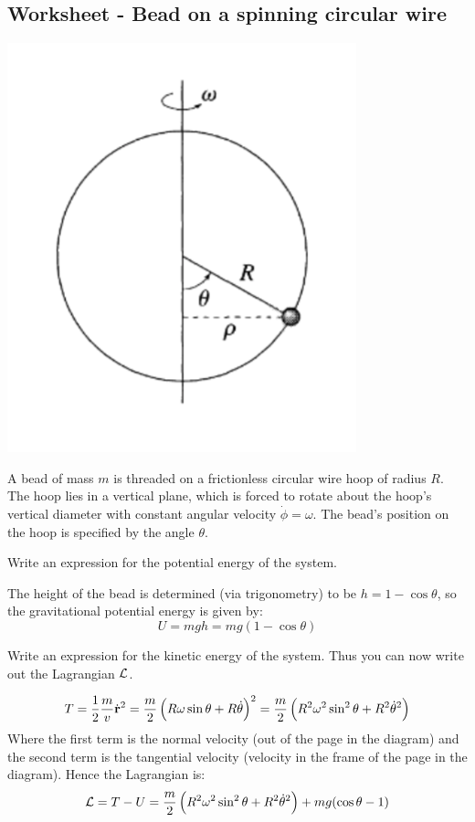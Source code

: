\documentclass[../PHYS306Notes.tex]{subfiles}
\begin{document}
\subsection{Worksheet - Bead on a spinning circular wire}
\begin{center}
\includegraphics[scale=1]{Lecture-5/W5-img1.png}
\end{center}
A bead of mass $m$ is threaded on a frictionless circular wire hoop of radius $R$. The hoop lies in a vertical plane, which is forced to rotate about the hoop's vertical diameter with constant angular velocity $\dot{\phi} = \omega$. The bead's position on the hoop is specified by the angle $\theta$.

\begin{p}
Write an expression for the potential energy of the system.
\end{p}
\begin{s}
The height of the bead is determined (via trigonometry) to be $h = 1 - \cos\theta$, so the gravitational potential energy is given by:
\[U = mgh = mg(1-\cos\theta)\]
\end{s}

\begin{p}
Write an expression for the kinetic energy of the system. Thus you can now write out the Lagrangian $\mathcal{L}$.
\end{p}
\begin{s}
\[T = \frac{1}{2}\frac{m}{v}\dot{\mathbf{r}}^2 = \frac{m}{2}\left(R\omega\sin\theta + R\dot{\theta}\right)^2 = \frac{m}{2}\left(R^2\omega^2\sin^2\theta + R^2\dot{\theta}^2\right) \]
Where the first term is the normal velocity (out of the page in the diagram) and the second term is the tangential velocity (velocity in the frame of the page in the diagram). Hence the Lagrangian is:
\[\mathcal{L} = T - U = \frac{m}{2}\left(R^2\omega^2\sin^2\theta + R^2\dot{\theta}^2\right) +mg(\cos\theta-1)\] 
\end{s}
\end{document}
